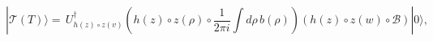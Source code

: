 \begin{equation}\label{eq:TofTdef2}
  |\mathcal{T}(T)\rangle = \,U_{h(z)\circ z(v)}^{\dagger} 
(h(z)\circ z(\rho) \circ \frac{1}{2 \pi i}\int d\rho\, b(\rho))
\left(h(z)\circ z(w)\circ \mathcal{B} 
\right)|0\rangle,
\end{equation}

